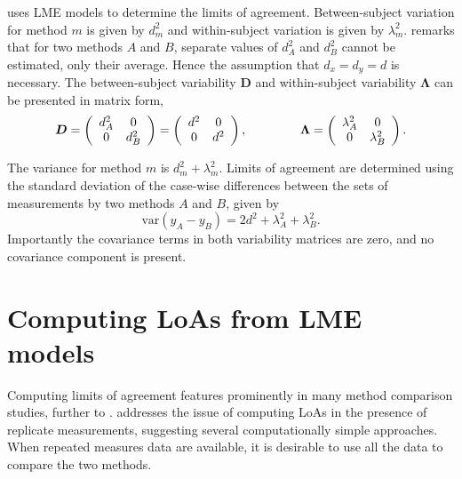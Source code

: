 \documentclass[12pt, a4paper]{report}
\theoremstyle{plain}
\theoremstyle{definition}
\theoremstyle{remark}
\begin{document}
	\citet{BXC2008} uses LME models to determine the limits of agreement. Between-subject variation for method $m$ is given by $d^2_{m}$ and within-subject variation is given by $\lambda^2_{m}$.  \citet{BXC2008} remarks that for two methods $A$ and $B$, separate values of $d^2_{A}$ and $d^2_{B}$ cannot be estimated, only their average. Hence the assumption that $d_{x}= d_{y}= d$ is necessary. The between-subject variability $\boldsymbol{D}$ and within-subject variability $\boldsymbol{\Lambda}$ can be presented in matrix form,\[
	\boldsymbol{D} = \left(%
	\begin{array}{cc}
	d^2_{A}& 0 \\
	0 & d^2_{B} \\
	\end{array}%
	\right)=\left(%
	\begin{array}{cc}
	d^2& 0 \\
	0 & d^2\\
	\end{array}%
	\right),
	\hspace{1.5cm}
	\boldsymbol{\Lambda} = \left(%
	\begin{array}{cc}
	\lambda^2_{A}& 0 \\
	0 & \lambda^2_{B} \\
	\end{array}%
	\right).
	\]
	
	The variance for method $m$ is $d^2_{m}+\lambda^2_{m}$. Limits of agreement are determined using the standard deviation of the case-wise differences between the sets of measurements by two methods $A$ and $B$, given by
	\begin{equation}
	\mbox{var} (y_{A}-y_{B}) = 2d^2 + \lambda^2_{A}+ \lambda^2_{B}.
	\end{equation}
	Importantly the covariance terms in both variability matrices are zero, and no covariance component is present.
	
		

\section{Computing LoAs from LME models}

Computing limits of agreement features prominently in many method comparison studies, further to \citet{BA86,BA99}.
\citet{BA99} addresses the issue of computing LoAs in the presence of replicate measurements, suggesting several computationally simple approaches. When repeated measures data are available, it is desirable to use
all the data to compare the two methods.
\end{document}

